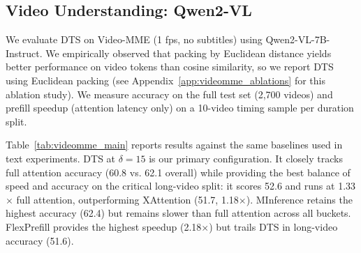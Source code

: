 \subsection{Video Understanding: Qwen2-VL}
\label{sec:results_video}

We evaluate DTS on Video-MME (1 fps, no subtitles) using Qwen2-VL-7B-Instruct. We empirically observed that packing by Euclidean distance yields better performance on video tokens than cosine similarity, so we report DTS using Euclidean packing (see Appendix~\ref{app:videomme_ablations} for this ablation study). We measure accuracy on the full test set (2,700 videos) and prefill speedup (attention latency only) on a 10-video timing sample per duration split. 

Table~\ref{tab:videomme_main} reports results against the same baselines used in text experiments. DTS at $\delta{=}15$ is our primary configuration. It closely tracks full attention accuracy (60.8 vs. 62.1 overall) while providing the best balance of speed and accuracy on the critical long-video split: it scores 52.6 and runs at 1.33$\times$ full attention, outperforming XAttention (51.7, 1.18$\times$). MInference retains the highest accuracy (62.4) but remains slower than full attention across all buckets. FlexPrefill provides the highest speedup (2.18$\times$) but trails DTS in long-video accuracy (51.6).

\begin{table}[!ht]
\centering
\caption{Video-MME accuracy and prefill speedup on Qwen2-VL-7B-Instruct (Video-MME @ 1fps, no subtitles). Accuracy (\%) is on the full test set ($n{=}2700$). Speedup ($\times$full) is attention-kernel latency (self\_attn\_ms) relative to full attention on a 10-videos-per-bucket timing sample. Best accuracy per column in \textbf{bold}.}
\label{tab:videomme_main}
\end{table}

